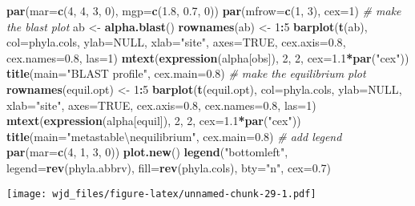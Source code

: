\documentclass[]{article}
\newenvironment{Shaded}{\begin{snugshade}}{\end{snugshade}}
\newcommand{\KeywordTok}[1]{\textcolor[rgb]{0.13,0.29,0.53}{\textbf{#1}}}
\newcommand{\DataTypeTok}[1]{\textcolor[rgb]{0.13,0.29,0.53}{#1}}
\newcommand{\DecValTok}[1]{\textcolor[rgb]{0.00,0.00,0.81}{#1}}
\newcommand{\FloatTok}[1]{\textcolor[rgb]{0.00,0.00,0.81}{#1}}
\newcommand{\CharTok}[1]{\textcolor[rgb]{0.31,0.60,0.02}{#1}}
\newcommand{\StringTok}[1]{\textcolor[rgb]{0.31,0.60,0.02}{#1}}
\newcommand{\CommentTok}[1]{\textcolor[rgb]{0.56,0.35,0.01}{\textit{#1}}}
\newcommand{\OtherTok}[1]{\textcolor[rgb]{0.56,0.35,0.01}{#1}}
\newcommand{\OperatorTok}[1]{\textcolor[rgb]{0.81,0.36,0.00}{\textbf{#1}}}
\newcommand{\NormalTok}[1]{#1}
\begin{document}
\begin{Shaded}
\begin{Highlighting}[]
\KeywordTok{par}\NormalTok{(}\DataTypeTok{mar=}\KeywordTok{c}\NormalTok{(}\DecValTok{4}\NormalTok{, }\DecValTok{4}\NormalTok{, }\DecValTok{3}\NormalTok{, }\DecValTok{0}\NormalTok{), }\DataTypeTok{mgp=}\KeywordTok{c}\NormalTok{(}\FloatTok{1.8}\NormalTok{, }\FloatTok{0.7}\NormalTok{, }\DecValTok{0}\NormalTok{))}
\KeywordTok{par}\NormalTok{(}\DataTypeTok{mfrow=}\KeywordTok{c}\NormalTok{(}\DecValTok{1}\NormalTok{, }\DecValTok{3}\NormalTok{), }\DataTypeTok{cex=}\DecValTok{1}\NormalTok{)}
\CommentTok{# make the blast plot}
\NormalTok{ab <-}\StringTok{ }\KeywordTok{alpha.blast}\NormalTok{()}
\KeywordTok{rownames}\NormalTok{(ab) <-}\StringTok{ }\DecValTok{1}\OperatorTok{:}\DecValTok{5}
\KeywordTok{barplot}\NormalTok{(}\KeywordTok{t}\NormalTok{(ab), }\DataTypeTok{col=}\NormalTok{phyla.cols, }\DataTypeTok{ylab=}\OtherTok{NULL}\NormalTok{, }\DataTypeTok{xlab=}\StringTok{"site"}\NormalTok{, }\DataTypeTok{axes=}\OtherTok{TRUE}\NormalTok{, }\DataTypeTok{cex.axis=}\FloatTok{0.8}\NormalTok{, }\DataTypeTok{cex.names=}\FloatTok{0.8}\NormalTok{, }\DataTypeTok{las=}\DecValTok{1}\NormalTok{)}
\KeywordTok{mtext}\NormalTok{(}\KeywordTok{expression}\NormalTok{(alpha[obs]), }\DecValTok{2}\NormalTok{, }\DecValTok{2}\NormalTok{, }\DataTypeTok{cex=}\FloatTok{1.1}\OperatorTok{*}\KeywordTok{par}\NormalTok{(}\StringTok{"cex"}\NormalTok{))}
\KeywordTok{title}\NormalTok{(}\DataTypeTok{main=}\StringTok{"BLAST profile"}\NormalTok{, }\DataTypeTok{cex.main=}\FloatTok{0.8}\NormalTok{)}
\CommentTok{# make the equilibrium plot}
\KeywordTok{rownames}\NormalTok{(equil.opt) <-}\StringTok{ }\DecValTok{1}\OperatorTok{:}\DecValTok{5}
\KeywordTok{barplot}\NormalTok{(}\KeywordTok{t}\NormalTok{(equil.opt), }\DataTypeTok{col=}\NormalTok{phyla.cols, }\DataTypeTok{ylab=}\OtherTok{NULL}\NormalTok{, }\DataTypeTok{xlab=}\StringTok{"site"}\NormalTok{, }\DataTypeTok{axes=}\OtherTok{TRUE}\NormalTok{, }\DataTypeTok{cex.axis=}\FloatTok{0.8}\NormalTok{,}
\DataTypeTok{cex.names=}\FloatTok{0.8}\NormalTok{, }\DataTypeTok{las=}\DecValTok{1}\NormalTok{)}
\KeywordTok{mtext}\NormalTok{(}\KeywordTok{expression}\NormalTok{(alpha[equil]), }\DecValTok{2}\NormalTok{, }\DecValTok{2}\NormalTok{, }\DataTypeTok{cex=}\FloatTok{1.1}\OperatorTok{*}\KeywordTok{par}\NormalTok{(}\StringTok{"cex"}\NormalTok{))}
\KeywordTok{title}\NormalTok{(}\DataTypeTok{main=}\StringTok{"metastable}\CharTok{\textbackslash{}n}\StringTok{equilibrium"}\NormalTok{, }\DataTypeTok{cex.main=}\FloatTok{0.8}\NormalTok{)}
\CommentTok{# add legend}
\KeywordTok{par}\NormalTok{(}\DataTypeTok{mar=}\KeywordTok{c}\NormalTok{(}\DecValTok{4}\NormalTok{, }\DecValTok{1}\NormalTok{, }\DecValTok{3}\NormalTok{, }\DecValTok{0}\NormalTok{))}
\KeywordTok{plot.new}\NormalTok{()}
\KeywordTok{legend}\NormalTok{(}\StringTok{"bottomleft"}\NormalTok{, }\DataTypeTok{legend=}\KeywordTok{rev}\NormalTok{(phyla.abbrv), }\DataTypeTok{fill=}\KeywordTok{rev}\NormalTok{(phyla.cols), }\DataTypeTok{bty=}\StringTok{"n"}\NormalTok{, }\DataTypeTok{cex=}\FloatTok{0.7}\NormalTok{)}
\end{Highlighting}
\end{Shaded}

\texttt{[image: wjd\_files/figure-latex/unnamed-chunk-29-1.pdf]}
\end{document}
